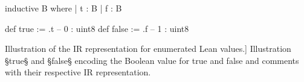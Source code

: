 \begin{listing}[H]
\begin{LeanCode}
inductive B where
  | t : B
  | f : B

def true  := .t -- 0 : uint8
def false := .f -- 1 : uint8
\end{LeanCode}
\caption
  [Illustration of the IR representation for enumerated Lean values.]
  {Illustration §true§ and §false§ encoding the Boolean value for true and false and comments with their respective IR representation.}
\label{lst:ir2}
\end{listing}
